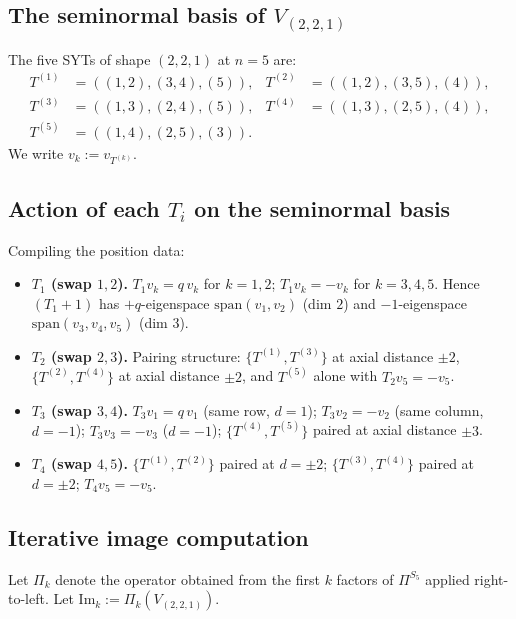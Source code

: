 \documentclass[11pt]{article}
\theoremstyle{definition}
\begin{document}
\subsection{The seminormal basis of $V_{(2,2,1)}$}

The five SYTs of shape $(2,2,1)$ at $n=5$ are:
\begin{align*}
T^{(1)} &= ((1,2),(3,4),(5)), &
T^{(2)} &= ((1,2),(3,5),(4)), \\
T^{(3)} &= ((1,3),(2,4),(5)), &
T^{(4)} &= ((1,3),(2,5),(4)), \\
T^{(5)} &= ((1,4),(2,5),(3)). &
\end{align*}
We write $v_k := v_{T^{(k)}}$.

\subsection{Action of each $T_i$ on the seminormal basis}

Compiling the position data:
\begin{itemize}[topsep=0.3em,itemsep=0.2em,leftmargin=2em]
\item \textbf{$T_1$ (swap $1, 2$).}
  $T_1 v_k = q\, v_k$ for $k=1,2$;
  $T_1 v_k = -v_k$ for $k=3,4,5$.
  Hence $(T_1{+}1)$ has $+q$-eigenspace $\mathrm{span}(v_1, v_2)$
  (dim $2$) and $-1$-eigenspace $\mathrm{span}(v_3, v_4, v_5)$
  (dim $3$).
\item \textbf{$T_2$ (swap $2, 3$).}
  Pairing structure:
  $\{T^{(1)}, T^{(3)}\}$ at axial distance $\pm 2$,
  $\{T^{(2)}, T^{(4)}\}$ at axial distance $\pm 2$,
  and $T^{(5)}$ alone with $T_2 v_5 = -v_5$.
\item \textbf{$T_3$ (swap $3, 4$).}
  $T_3 v_1 = q\, v_1$ (same row, $d=1$);
  $T_3 v_2 = -v_2$ (same column, $d=-1$);
  $T_3 v_3 = -v_3$ ($d=-1$);
  $\{T^{(4)}, T^{(5)}\}$ paired at axial distance $\pm 3$.
\item \textbf{$T_4$ (swap $4, 5$).}
  $\{T^{(1)}, T^{(2)}\}$ paired at $d = \pm 2$;
  $\{T^{(3)}, T^{(4)}\}$ paired at $d = \pm 2$;
  $T_4 v_5 = -v_5$.
\end{itemize}

\subsection{Iterative image computation}

Let $\Pi_k$ denote the operator obtained from the first $k$ factors of
$\Pi^{S_5}$ applied right-to-left. Let $\mathrm{Im}_k := \Pi_k(V_{(2,2,1)})$.
\end{document}
